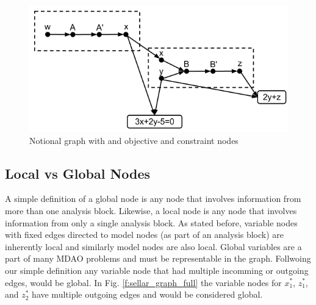\begin{figure}[htb!]
  \begin{center}
    \includegraphics[width=.6\textwidth]{images/obj_const_graph}
  \end{center}
  \caption{Notional graph with and objective and constraint nodes \label{f:obj-cons}}
\end{figure}


\subsection{Local vs Global Nodes}

  A simple definition of a global node is any node that involves information 
  from more than one analysis block. Likewise, a local node is any node 
  that involves information from only a single analysis block. As stated before, variable 
  nodes with fixed edges directed to model nodes (as part of an analysis block) are inherently local 
  and similarly model nodes are also local. Global variables are a part of many 
  MDAO problems and must be representable in the graph. Follwoing our simple definition
  any variable node that had multiple incomming or outgoing edges, would be global. 
  In Fig. \ref{f:sellar_graph_full} the variable nodes for $x_1^*$, $z_1^*$, and $z_2^*$ 
  have multiple outgoing edges and would be considered global. 

